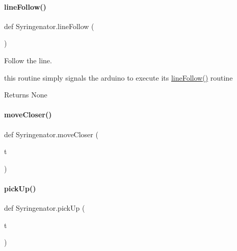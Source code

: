 \paragraph{\texorpdfstring{lineFollow()}{lineFollow()}}
{\footnotesize\ttfamily def Syringenator.\+line\+Follow (\begin{DoxyParamCaption}{ }\end{DoxyParamCaption})}



Follow the line. 

this routine simply signals the arduino to execute its \mbox{\hyperlink{namespaceSyringenator_a824ef6e71bc0975483435ffbdd58cb3e}{line\+Follow()}} routine

\begin{DoxyReturn}{Returns}
None 
\end{DoxyReturn}
\mbox{\label{namespaceSyringenator_a6aecf5518c352d012eb1422d9970146d}} 
\paragraph{\texorpdfstring{moveCloser()}{moveCloser()}}
{\footnotesize\ttfamily def Syringenator.\+move\+Closer (\begin{DoxyParamCaption}\item[{}]{t }\end{DoxyParamCaption})}

\mbox{\label{namespaceSyringenator_a9409dbfa8ede969288bb659ef23befb6}} 
\paragraph{\texorpdfstring{pickUp()}{pickUp()}}
{\footnotesize\ttfamily def Syringenator.\+pick\+Up (\begin{DoxyParamCaption}\item[{}]{t }\end{DoxyParamCaption})}

\mbox{\label{namespaceSyringenator_afe04905c8a4a9d077457422866633203}} 
